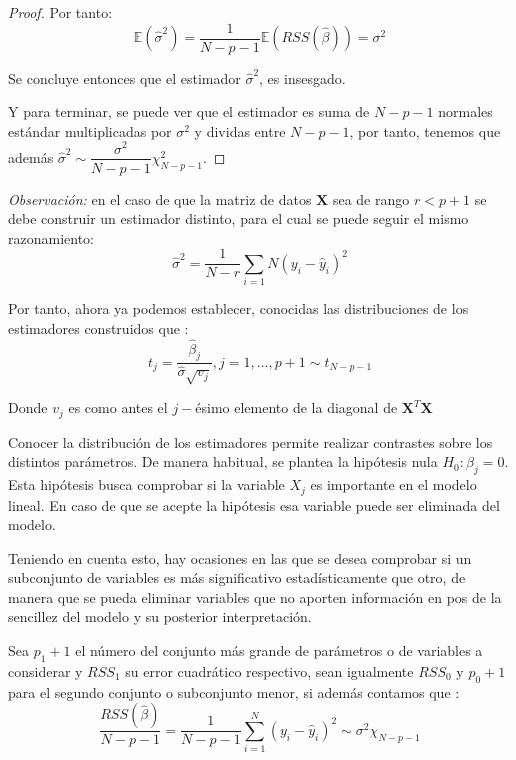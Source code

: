 \begin{propo}
\begin{proof}
\noindent Por tanto:
\begin{equation}
\mathbb{E}(\hat{\sigma}^2)= \dfrac{1}{N-p-1}\mathbb{E}(RSS(\hat{\beta}))=\sigma^2
\end{equation}

\noindent Se concluye entonces que el estimador $\hat{\sigma}^2$, es insesgado. 

\noindent Y para terminar, se puede ver que el estimador es suma de $N-p-1$ normales estándar multiplicadas por $\sigma^2$ y dividas entre $N-p-1$, por tanto, tenemos que además $\hat{\sigma}^2\sim \dfrac{\sigma^2}{N-p-1}\chi^2_{N-p-1}$.
\end{proof}
\end{propo}

\noindent \emph{Observación: } en el caso de que la matriz de datos $\mathbf{X}$ sea de rango $r<p+1$ se debe construir un estimador distinto, para el cual se puede seguir el mismo razonamiento:
\begin{equation}
\hat{\sigma}^2=\dfrac{1}{N-r}\sum_{i=1}{N}(y_i-\hat{y}_i)^2
\end{equation}

\noindent Por tanto, ahora ya podemos establecer, conocidas las distribuciones de los estimadores construidos que \cite{Greene 2008,Hastie 2001}:
\begin{equation}
t_j=\dfrac{\hat{\beta}_j}{\hat{\sigma}\sqrt{v_j}}, j=1,\ldots ,p+1 \sim t_{N-p-1}
\end{equation}

\noindent Donde $v_j$ es como antes el $j-$ésimo elemento de la diagonal de $\mathbf{X}^T \mathbf{X}$

\noindent Conocer la distribución de los estimadores permite realizar contrastes sobre los distintos parámetros. De manera habitual, se plantea la hipótesis nula $H_0: \beta_j=0 $. Esta hipótesis busca comprobar si la variable $X_j$ es importante en el modelo lineal. En caso de que se acepte la hipótesis esa variable puede ser eliminada del modelo. 


\noindent Teniendo en cuenta esto,  hay ocasiones en las que se desea comprobar si un subconjunto de variables es más significativo estadísticamente que otro, de manera que se pueda eliminar variables que no aporten información en pos de la sencillez del modelo y su posterior interpretación. 

\noindent Sea $p_1+1$ el número del conjunto más grande de parámetros o de variables a considerar y $RSS_1$ su error cuadrático respectivo, sean igualmente $RSS_0$ y $p_0+1$ para el segundo conjunto o subconjunto menor, si además contamos que :
\begin{equation}
\frac{RSS(\hat{\beta})}{N-p-1}=\frac{1}{N-p-1}\sum_{i=1}^N(y_i-\hat{y}_i)^2\sim \sigma^2 \chi_{N-p-1}
\end{equation}

